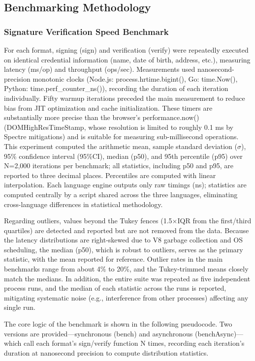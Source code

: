 \documentclass[conference]{IEEEtran}
\begin{document}
\subsection{Benchmarking Methodology}

\subsubsection{Signature Verification Speed Benchmark}

For each format, signing (sign) and verification (verify) were repeatedly executed on identical credential information (name, date of birth, address, etc.), measuring latency (ms/op) and throughput (ops/sec). Measurements used nanosecond-precision monotonic clocks (Node.js: process.hrtime.bigint(), Go: time.Now(), Python: time.perf\_counter\_ns()), recording the duration of each iteration individually. Fifty warmup iterations preceded the main measurement to reduce bias from JIT optimization and cache initialization. These timers are substantially more precise than the browser's performance.now() (DOMHighResTimeStamp, whose resolution is limited to roughly 0.1 ms by Spectre mitigations) and is suitable for measuring sub-millisecond operations. This experiment computed the arithmetic mean, sample standard deviation ($\sigma$), 95\% confidence interval (95\%CI), median (p50), and 95th percentile (p95) over N=2,000 iterations per benchmark; all statistics, including p50 and p95, are reported to three decimal places. Percentiles are computed with linear interpolation. Each language engine outputs only raw timings (ns); statistics are computed centrally by a script shared across the three languages, eliminating cross-language differences in statistical methodology.

Regarding outliers, values beyond the Tukey fences (1.5$\times$IQR from the first/third quartiles) are detected and reported but are not removed from the data. Because the latency distributions are right-skewed due to V8 garbage collection and OS scheduling, the median (p50), which is robust to outliers, serves as the primary statistic, with the mean reported for reference. Outlier rates in the main benchmarks range from about 4\% to 20\%, and the Tukey-trimmed means closely match the medians. In addition, the entire suite was repeated as five independent process runs, and the median of each statistic across the runs is reported, mitigating systematic noise (e.g., interference from other processes) affecting any single run.

The core logic of the benchmark is shown in the following pseudocode. Two versions are provided---synchronous (bench) and asynchronous (benchAsync)---which call each format's sign/verify function N times, recording each iteration's duration at nanosecond precision to compute distribution statistics.
\end{document}

